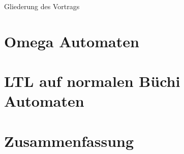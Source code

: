 \documentclass[14pt]{beamer}
\date{23. Februar 2016}
\def\tocname{Gliederung des Vortrags}
\begin{document}
\fontsize{14pt}{14pt}
	
{
\begin{frame}%
	\titlepage
\end{frame}}

\begin{frame}{\tocname}
	\tableofcontents
\end{frame}


\section{Omega Automaten}



\section{LTL auf normalen Büchi Automaten}
 

\section{Zusammenfassung}


\section{\bibname}
\begin{frame}[allowframebreaks]{\bibname}
	\AtBeginSection{}
	\nocite{*}
	
	
\end{frame}
\end{document}
